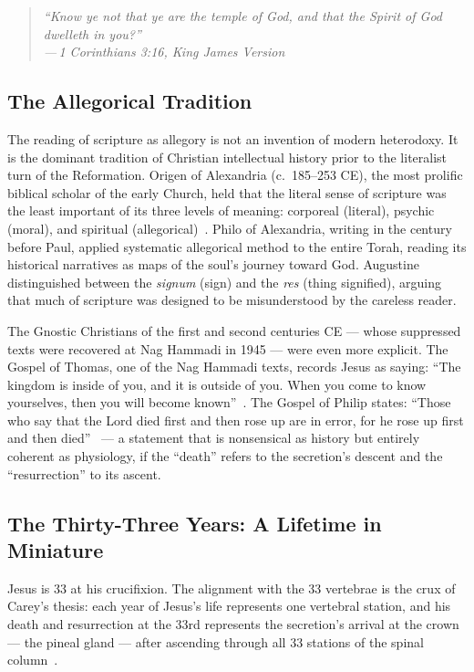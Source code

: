 \documentclass[12pt, a4paper]{article}
\newcommand{\epigraph}[2]{%
  \begin{quote}
    \itshape ``#1''\\[0.3em]
    \normalfont\small\hfill ---\,#2
  \end{quote}
}
\begin{document}
\epigraph{Know ye not that ye are the temple of God, and that the Spirit of
God dwelleth in you?}{1 Corinthians 3:16, King James Version}

\subsection{The Allegorical Tradition}

The reading of scripture as allegory is not an invention of modern
heterodoxy. It is the dominant tradition of Christian intellectual history
prior to the literalist turn of the Reformation. Origen of Alexandria (c.~185--253
CE), the most prolific biblical scholar of the early Church, held that the
literal sense of scripture was the least important of its three levels of
meaning: corporeal (literal), psychic (moral), and spiritual
(allegorical)~\autocite[211]{pagels1979}. Philo of Alexandria, writing in the
century before Paul, applied systematic allegorical method to the entire
Torah, reading its historical narratives as maps of the soul's journey toward
God. Augustine distinguished between the \emph{signum} (sign) and the
\emph{res} (thing signified), arguing that much of scripture was designed to
be misunderstood by the careless reader.

The Gnostic Christians of the first and second centuries CE — whose suppressed
texts were recovered at Nag Hammadi in 1945 — were even more explicit. The
Gospel of Thomas, one of the Nag Hammadi texts, records Jesus as saying: ``The
kingdom is inside of you, and it is outside of you. When you come to know
yourselves, then you will become known''~\autocite[126]{naglibhammadi}. The
Gospel of Philip states: ``Those who say that the Lord died first and then rose
up are in error, for he rose up first and then died''~\autocite[153]{naglibhammadi} —
a statement that is nonsensical as history but entirely coherent as
physiology, if the ``death'' refers to the secretion's descent and the
``resurrection'' to its ascent.

\subsection{The Thirty-Three Years: A Lifetime in Miniature}

Jesus is 33 at his crucifixion. The alignment with the 33 vertebrae is the
crux of Carey's thesis: each year of Jesus's life represents one vertebral
station, and his death and resurrection at the 33rd represents the
secretion's arrival at the crown — the pineal gland — after ascending through
all 33 stations of the spinal
column~\autocite[67]{carey1920}.
\end{document}
